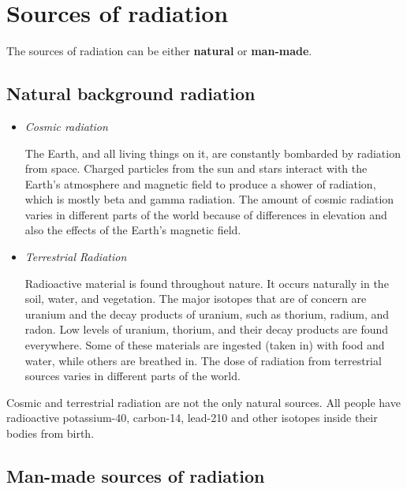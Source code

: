



\section{Sources of radiation}
\label{sec:an:sources}

The sources of radiation can be either \textbf{natural} or \textbf{man-made}.

\subsection{Natural background radiation}
\begin{itemize}
\item{\textit{Cosmic radiation}

The Earth, and all living things on it, are constantly bombarded by radiation from space. Charged particles from the sun and stars interact with the Earth's atmosphere and magnetic field to produce a shower of radiation, which is mostly beta and gamma radiation. The amount of cosmic radiation varies in different parts of the world because of differences in elevation and also the effects of the Earth's magnetic field.
}
\item{\textit{Terrestrial Radiation}

Radioactive material is found throughout nature. It occurs naturally in the soil, water, and vegetation. The major isotopes that are of concern are uranium and the decay products of uranium, such as thorium, radium, and radon. Low levels of uranium, thorium, and their decay products are found everywhere. Some of these materials are ingested (taken in) with food and water, while others are breathed in. The dose of radiation from terrestrial sources varies in different parts of the world.
}
\end{itemize}


\begin{IFact}{
Cosmic and terrestrial radiation are not the only natural sources. All people have radioactive potassium-40, carbon-14, lead-210 and other isotopes inside their bodies from birth.
}
\end{IFact}

\subsection{Man-made sources of radiation}

